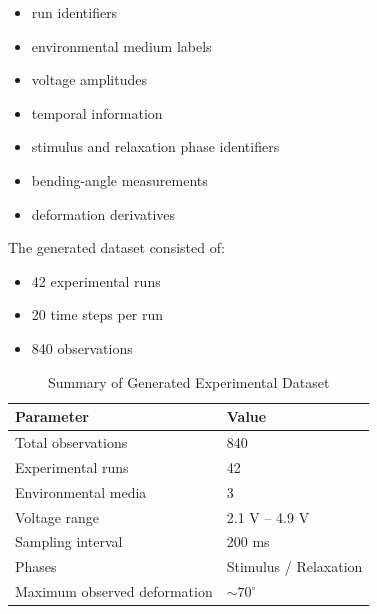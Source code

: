 \documentclass[11pt,a4paper]{article}
\begin{document}
\begin{itemize}

\item run identifiers

\item environmental medium labels

\item voltage amplitudes

\item temporal information

\item stimulus and relaxation phase identifiers

\item bending-angle measurements

\item deformation derivatives

\end{itemize}

The generated dataset consisted of:

\begin{itemize}

\item 42 experimental runs

\item 20 time steps per run

\item 840 observations

\end{itemize}

\begin{table}[H]

\centering

\caption{Summary of Generated Experimental Dataset}

\begin{tabular}{ll}

\toprule

Parameter & Value \\

\midrule

Total observations & 840 \\

Experimental runs & 42 \\

Environmental media & 3 \\

Voltage range & 2.1 V -- 4.9 V \\

Sampling interval & 200 ms \\

Phases & Stimulus / Relaxation \\

Maximum observed deformation & $\sim70^\circ$ \\

\bottomrule

\end{tabular}

\label{tab:dataset}

\end{table}
\end{document}
